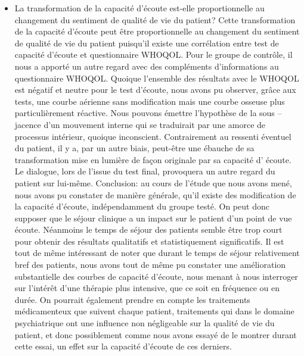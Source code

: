 \begin{itemize}
 
 	\item La transformation de la capacité d'écoute est-elle  proportionnelle au changement 
 	du sentiment de qualité de vie du patient?
   Cette transformation de la capacité d'écoute peut être proportionnelle au changement du sentiment de 
   qualité de vie du patient puisqu'il existe une corrélation entre test de capacité d'écoute et questionnaire 
   WHOQOL.
 \newline 
     Pour le groupe de contrôle, il nous a
 apporté un autre regard avec des compléments d'informations au 
 questionnaire
 WHOQOL. Quoique l'ensemble des résultats avec le WHOQOL est
 négatif et neutre pour le
 test d'écoute, nous avons pu observer, grâce aux tests, une 
 courbe 
 aérienne
 sans modification mais une courbe osseuse plus
 particulièrement réactive. 
 Nous pouvons émettre l'hypothèse de   %
 la sous -- jacence 
 d'un mouvement interne qui se traduirait par 
 une amorce de
 processus intérieur,  quoique inconscient. Contrairement au ressenti éventuel du patient, il y  a, par un 
 autre biais, peut-être une 
 ébauche de sa transformation mise en lumière de façon originale  par sa capacité d'
 écoute. Le dialogue, lors de l'issue du test final, provoquera un autre 
 regard du patient sur lui-même.
  \newline 
 Conclusion: au cours de l'étude que nous avons mené, nous avons pu constater de manière générale, 
 qu'il existe des modification de la capacité d'écoute, indépendamment du groupe testé. On peut donc 
 supposer que le séjour clinique a un impact sur le patient d'un point de vue écoute.
 \newline 
 Néanmoins le temps de séjour des patients semble être trop court pour obtenir des résultats qualitatifs 
 et statistiquement significatifs. Il est tout de même intéressant de noter que durant le temps de séjour 
 relativement bref des patients, nous avons tout de même pu constater une amélioration substantielle 
 des courbes de capacité d'écoute, nous menant à nous interroger sur l'intérêt d'une thérapie plus 
 intensive, que ce soit en fréquence ou en durée. On pourrait également prendre en compte les 
 traitements médicamenteux que suivent chaque patient, traitements qui dans le domaine psychiatrique 
 ont une influence non négligeable sur la qualité de vie du patient, et donc possiblement comme nous 
 avons essayé de le montrer durant cette essai, un effet sur la capacité d'écoute de ces derniers.
 
 
  

\end{itemize}
